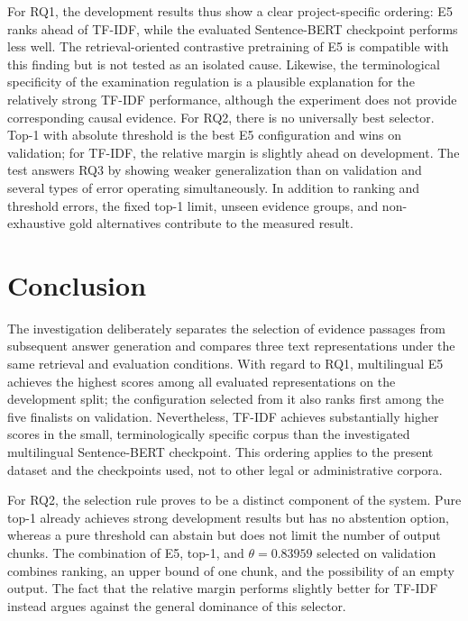 \documentclass[11pt]{article}
\begin{document}
For RQ1, the development results thus show a clear project-specific ordering: E5 ranks ahead of TF-IDF, while the evaluated Sentence-BERT checkpoint performs less well. The retrieval-oriented contrastive pretraining of E5 is compatible with this finding but is not tested as an isolated cause. Likewise, the terminological specificity of the examination regulation is a plausible explanation for the relatively strong TF-IDF performance, although the experiment does not provide corresponding causal evidence. For RQ2, there is no universally best selector. Top-1 with absolute threshold is the best E5 configuration and wins on validation; for TF-IDF, the relative margin is slightly ahead on development. The test answers RQ3 by showing weaker generalization than on validation and several types of error operating simultaneously. In addition to ranking and threshold errors, the fixed top-1 limit, unseen evidence groups, and non-exhaustive gold alternatives contribute to the measured result.


\section{Conclusion}

The investigation deliberately separates the selection of evidence passages from subsequent answer generation and compares three text representations under the same retrieval and evaluation conditions. With regard to RQ1, multilingual E5 achieves the highest scores among all evaluated representations on the development split; the configuration selected from it also ranks first among the five finalists on validation. Nevertheless, TF-IDF achieves substantially higher scores in the small, terminologically specific corpus than the investigated multilingual Sentence-BERT checkpoint. This ordering applies to the present dataset and the checkpoints used, not to other legal or administrative corpora.

For RQ2, the selection rule proves to be a distinct component of the system. Pure top-1 already achieves strong development results but has no abstention option, whereas a pure threshold can abstain but does not limit the number of output chunks. The combination of E5, top-1, and $\theta=0.83959$ selected on validation combines ranking, an upper bound of one chunk, and the possibility of an empty output. The fact that the relative margin performs slightly better for TF-IDF instead argues against the general dominance of this selector.
\end{document}
